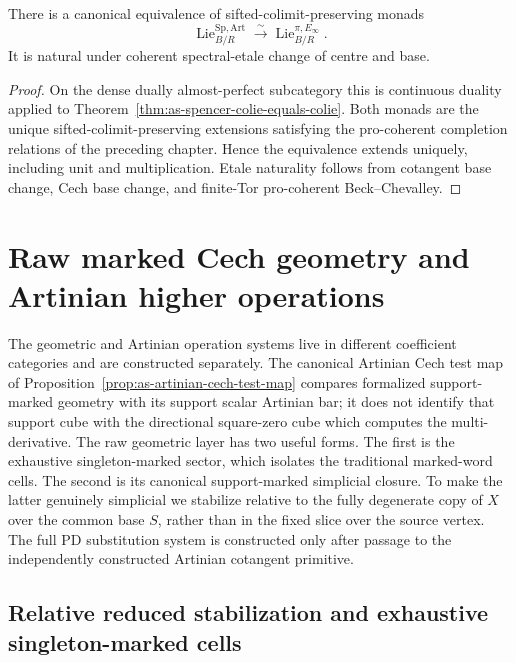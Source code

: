 \begin{theorem}
\label{thm:as-integral-monad-comparison}
There is a canonical equivalence of sifted-colimit-preserving monads
\[
\boxed{
    \operatorname{Lie}^{\mathrm{Sp,Art}}_{B/R}
    \xrightarrow{\sim}
    \operatorname{Lie}^{\pi,E_\infty}_{B/R}.
}
\]
It is natural under coherent spectral-etale change of centre and base.
\end{theorem}

\begin{proof}
On the dense dually almost-perfect subcategory this is continuous duality
applied to
Theorem~\ref{thm:as-spencer-colie-equals-colie}.  Both monads are the unique
sifted-colimit-preserving extensions satisfying the pro-coherent completion
relations of the preceding chapter.  Hence the equivalence extends uniquely,
including unit and multiplication.  Etale naturality follows from cotangent
base change, Cech base change, and finite-Tor pro-coherent
Beck--Chevalley.
\end{proof}


\section{Raw marked Cech geometry and Artinian higher operations}
\label{sec:as-marked-operations}

The geometric and Artinian operation systems live in different coefficient
categories and are constructed separately.  The canonical Artinian Cech test
map of Proposition~\ref{prop:as-artinian-cech-test-map} compares formalized
support-marked geometry with its support scalar Artinian bar; it does not
identify that support cube with the directional square-zero cube which
computes the multi-derivative.  The raw geometric layer has two useful forms.  The first is the exhaustive singleton-marked sector, which
isolates the traditional marked-word cells.  The second is its canonical
support-marked simplicial closure.  To make the latter genuinely simplicial we
stabilize relative to the fully degenerate copy of $X$ over the common base
$S$, rather than in the fixed slice over the source vertex.  The full PD
substitution system is constructed only after passage to the independently
constructed Artinian cotangent primitive.

\subsection{Relative reduced stabilization and exhaustive singleton-marked cells}

